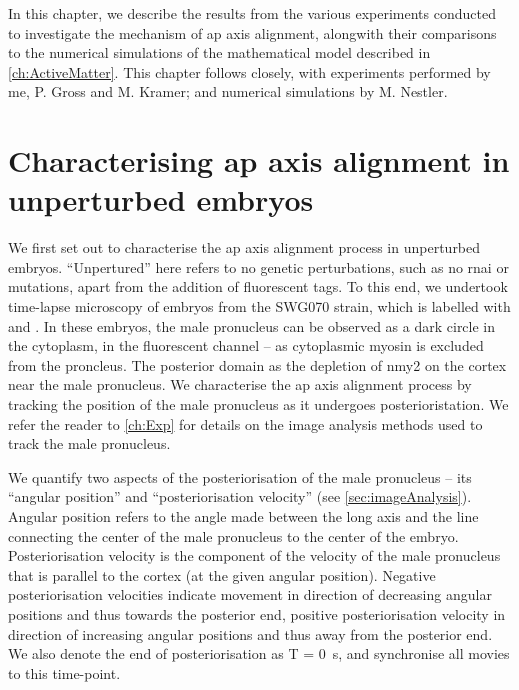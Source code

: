 In this chapter, we describe the results from the various experiments conducted to investigate the mechanism of \ac{ap} axis alignment, alongwith their comparisons to the numerical simulations of the mathematical model described in \autoref{ch:ActiveMatter}. This chapter follows \citep{} closely, with experiments performed by me, P. Gross and M. Kramer; and numerical simulations by M. Nestler. 

\section{Characterising \ac{ap} axis alignment in unperturbed embryos} \label{sec:apAxisAlignCharacteriseWT}
We first set out to characterise the \ac{ap} axis alignment process in unperturbed embryos. \enquote{Unpertured} here refers to no genetic perturbations, such as no \ac{rnai} or mutations, apart from the addition of fluorescent tags. To this end, we undertook time-lapse microscopy of embryos from the SWG070 strain, which is labelled with  and . In these embryos, the male pronucleus can be observed as a dark circle in the cytoplasm, in the  fluorescent channel -- as cytoplasmic myosin is excluded from the proncleus. The posterior domain as the depletion of \ac{nmy2} on the cortex near the male pronucleus. We characterise the \ac{ap} axis alignment process by tracking the position of the male pronucleus as it undergoes posterioristation. We refer the reader to \autoref{ch:Exp} for details on the image analysis methods used to track the male pronucleus. 

We quantify two aspects of the posteriorisation of the male pronucleus -- its \enquote{angular position} and \enquote{posteriorisation velocity} (see \autoref{sec:imageAnalysis}). Angular position refers to the angle made between the long axis and the line connecting the center of the male pronucleus to the center of the embryo. Posteriorisation velocity is the component of the velocity of the male pronucleus that is parallel to the cortex (at the given angular position). Negative posteriorisation velocities indicate movement in direction of decreasing angular positions and thus towards the posterior end, positive posteriorisation velocity in direction of increasing angular positions and thus away from the posterior end. We also denote the end of posteriorisation as T = \SI{0}{\second}, and synchronise all movies to this time-point. 

